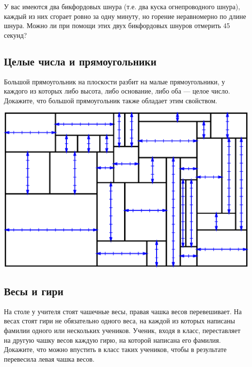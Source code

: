 У вас имеются два бикфордовых шнура (т.е. два куска огнепроводного шнура), каждый из них сгорает ровно за одну минуту, но горение неравномерно по длине шнура. Можно ли при помощи этих двух бикфордовых шнуров отмерить 45 секунд?






\subsection*{Целые числа и прямоугольники} %



Большой прямоугольник на плоскости разбит на малые прямоугольники, у каждого из которых  либо высота, либо основание, либо оба --- целое число.  
Докажите, что большой прямоугольник также обладает этим свойством.

\begin{center}
\includegraphics[scale=0.6]{Figs/Insight/rect}
\end{center}


\subsection*{Весы и гири}    %



На столе у учителя стоят чашечные весы, правая чашка весов перевешивает. На весах стоят гири не обязательно одного веса, на каждой из которых написаны фамилии одного или нескольких учеников. Ученик, входя в класс, переставляет на другую чашку весов каждую гирю, на которой написана его фамилия.
Докажите, что можно впустить в класс таких учеников, чтобы в результате перевесила левая чашка весов.




